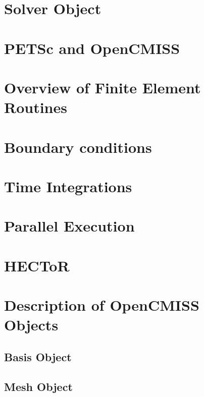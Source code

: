 
\section{Solver Object}
\label{sec:devel_solver}

\section{PETSc and OpenCMISS}
\label{sec:devel_petsc}

\section{Overview of Finite Element Routines}
\label{sec:devel_fe_routines}


\section{Boundary conditions}
\label{sec:devel_bc}

\section{Time Integrations}
\label{sec:devel_time_integrations}

\section{Parallel Execution}
\label{sec:devel_parallel}

\section{HECToR}
\label{sec:devel_hector}

\section{Description of OpenCMISS Objects}
\label{sec:devel_objects}

\subsection{Basis Object}
\label{sec:devel_basis}

\subsection{Mesh Object}
\label{sec:devel_mesh}

